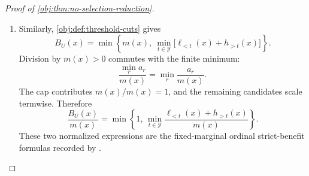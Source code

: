 \begin{proof}[Proof of \cref{obj:thm:no-selection-reduction}]
\begin{enumerate}
\item
Similarly, \cref{obj:def:threshold-cuts} gives
\[
B_U(x)
=
\min\left\{
m(x),\
\min_{t\in\mathcal Y}\bigl[\ell_{<t}(x)+h_{>t}(x)\bigr]
\right\}.
\]
Division by \(m(x)>0\) commutes with the finite minimum:
\[
\frac{\min_r a_r}{m(x)}
=
\min_r \frac{a_r}{m(x)}.
\]
The cap contributes \(m(x)/m(x)=1\), and the remaining candidates scale termwise.  Therefore
\[
\frac{B_U(x)}{m(x)}
=
\min\left\{
1,\,
\min_{t\in\mathcal Y}
\frac{\ell_{<t}(x)+h_{>t}(x)}{m(x)}
\right\}.
\]
These two normalized expressions are the fixed-marginal ordinal strict-benefit formulas recorded by \citep[Proposition 2, equation (6), p.~546]{LuDingDasgupta2018}.
\end{enumerate}
\end{proof}
